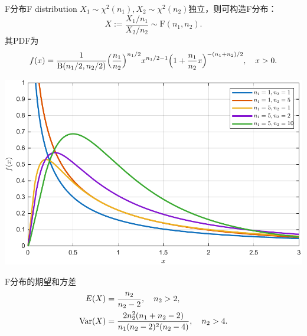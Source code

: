 \begin{definition}{F分布}{F distribution}
	$X_1\sim\chi^2(n_1),X_2\sim\chi^2(n_2)$独立，则可构造F分布：
	\[
		X:=\frac{X_1/n_1}{X_2/n_2}\sim\mathrm F(n_1,n_2).
	\]
	其PDF为
	\begin{equation}
		f(x)=\frac1{\mathrm B(n_1/2,n_2/2)}\Bigl(\frac{n_1}{n_2}\Bigr)^{n_1/2}x^{n_1/2-1}\Bigl(1+\frac{n_1}{n_2}x\Bigr)^{-(n_1+n_2)/2},\quad x>0.
	\end{equation}
	\begin{center}
		\includegraphics[width=0.8\linewidth]{figures/pdf_F.pdf}
		\label{fig:pdf_F}
	\end{center}
\end{definition}

\begin{corollary}
	F分布的期望和方差
	\begin{subequations}
		\begin{align}
			E(X)&=\frac{n_2}{n_2-2},\quad n_2>2,\\
			\operatorname{Var}(X)&=\frac{2n_2^2(n_1+n_2-2)}{n_1(n_2-2)^2(n_2-4)},\quad n_2>4.
		\end{align}
	\end{subequations}
\end{corollary}




